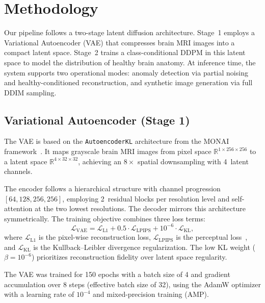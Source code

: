 \section{Methodology}
\label{sec:methodology}

Our pipeline follows a two-stage latent diffusion architecture. Stage~1 employs a Variational Autoencoder (VAE) that compresses brain MRI images into a compact latent space. Stage~2 trains a class-conditional DDPM in this latent space to model the distribution of healthy brain anatomy. At inference time, the system supports two operational modes: anomaly detection via partial noising and healthy-conditioned reconstruction, and synthetic image generation via full DDIM sampling.

\subsection{Variational Autoencoder (Stage 1)}
\label{sec:vae}

The VAE is based on the \texttt{AutoencoderKL} architecture from the MONAI framework~\cite{monai2022, pinaya2023generative}. It maps grayscale brain MRI images from pixel space $\mathbb{R}^{1 \times 256 \times 256}$ to a latent space $\mathbb{R}^{4 \times 32 \times 32}$, achieving an $8\times$ spatial downsampling with 4~latent channels.

The encoder follows a hierarchical structure with channel progression $[64, 128, 256, 256]$, employing 2~residual blocks per resolution level and self-attention at the two lowest resolutions. The decoder mirrors this architecture symmetrically. The training objective combines three loss terms:
\begin{equation}
\mathcal{L}_{\text{VAE}} = \mathcal{L}_{\text{L1}} + 0.5 \cdot \mathcal{L}_{\text{LPIPS}} + 10^{-6} \cdot \mathcal{L}_{\text{KL}},
\label{eq:vae_loss}
\end{equation}
where $\mathcal{L}_{\text{L1}}$ is the pixel-wise reconstruction loss, $\mathcal{L}_{\text{LPIPS}}$ is the perceptual loss~\cite{zhang2018perceptual}, and $\mathcal{L}_{\text{KL}}$ is the Kullback--Leibler divergence regularization. The low KL weight ($\beta = 10^{-6}$) prioritizes reconstruction fidelity over latent space regularity.

The VAE was trained for 150 epochs with a batch size of 4 and gradient accumulation over 8 steps (effective batch size of 32), using the AdamW optimizer with a learning rate of $10^{-4}$ and mixed-precision training (AMP).

